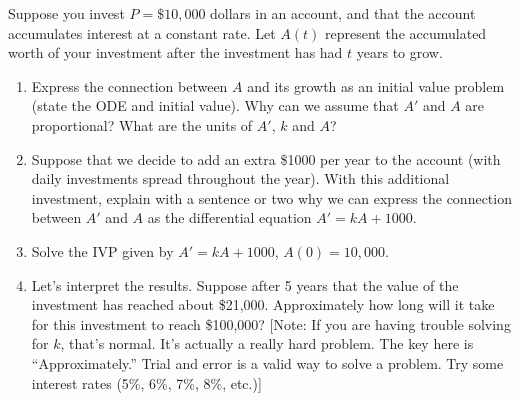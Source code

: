 \begin{problem}\label{investment example}
 Suppose you invest $P=\$10,000$ dollars in an account, and that the account accumulates interest at a constant rate. Let $A(t)$ represent the accumulated worth of your investment after the investment has had $t$ years to grow.
\begin{enumerate}
 \item Express the connection between $A$ and its growth as an initial value problem (state the ODE and initial value).  Why can we assume that $A'$ and $A$ are proportional? What are the units of $A'$, $k$ and $A$? 
 \item Suppose that we decide to add an extra \$1000 per year to the account (with daily investments spread throughout the year).
 With this additional investment, explain with a sentence or two why we can express the connection between $A'$ and $A$ as the differential equation $A'=kA+1000$. 
 \item Solve the IVP given by $A'=kA+1000$, $A(0)=10,000$. 
 \item Let's interpret the results. Suppose after 5 years that the value of the investment has reached about \$21,000.  Approximately how long will it take for this investment to reach \$100,000?  [Note: If you are having trouble solving for $k$, that's normal.  It's actually a really hard problem. The key here is ``Approximately.'' Trial and error is a valid way to solve a problem.  Try some interest rates (5\%, 6\%, 7\%, 8\%, etc.)]
\end{enumerate}

\end{problem}


